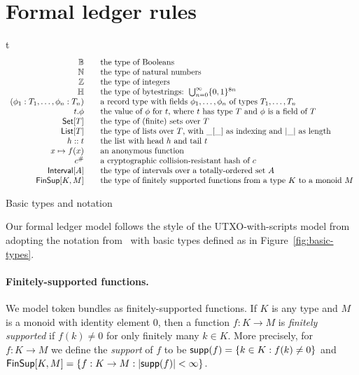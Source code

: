 \section{Formal ledger rules}
\label{sec:model}

\begin{ruledfigure}{t}
  \begin{displaymath}
    \begin{array}{rll}
      \B{} && \mbox{the type of Booleans}\\
      \N{} && \mbox{the type of natural numbers}\\
      \Z{} && \mbox{the type of integers}\\
      \H{} && \mbox{the type of bytestrings: } \bigcup_{n=0}^{\infty}\{0,1\}^{8n}\\
      (\phi_1 : T_1, \ldots, \phi_n : T_n) && \mbox{a record type with fields $\phi_1, \ldots, \phi_n$ of types $T_1, \ldots, T_n$}\\
      t.\phi && \mbox{the value of $\phi$ for $t$, where $t$ has type $T$ and $\phi$ is a field of $T$}\\
      \Set{T} && \mbox{the type of (finite) sets over $T$}\\
      \List{T} && \mbox{the type of lists over $T$, with $\_[\_]$ as indexing and $|\_|$ as length}\\
      h::t && \mbox{the list with head $h$ and tail $t$}\\
      x \mapsto f(x) && \mbox{an anonymous function}\\
      \hash{c} && \mbox{a cryptographic collision-resistant hash of $c$}\\
      \Interval{A} && \mbox{the type of intervals over a totally-ordered set $A$}\\
      \FinSup{K}{M} && \mbox{the type of finitely supported functions from a type $K$ to a monoid $M$}
    \end{array}
  \end{displaymath}
  \caption{Basic types and notation}
  \label{fig:basic-types}
\end{ruledfigure}
%
Our formal ledger model follows the style of the UTXO-with-scripts model from~\cite{Zahnentferner18-UTxO} adopting the notation from~\cite{eutxo-1-paper} with basic types defined as in Figure~\ref{fig:basic-types}.

\paragraph{Finitely-supported functions.}
\label{sec:fsfs}
%
We model token bundles as finitely-supported functions.
If $K$ is any type and $M$ is a monoid with identity element $0$, then a function $f: K \rightarrow M$ is \textit{finitely supported} if $f(k) \ne 0$ for only finitely many $k \in K$.
More precisely, for $f: K \rightarrow M$ we define the \textit{support} of $f$ to be
$\mathsf{supp}(f) = \{k \in K : f(k) \ne 0\}$
and
$\FinSup{K}{M} = \{f : K \rightarrow M : \left|\supp(f)\right| < \infty \}$.

